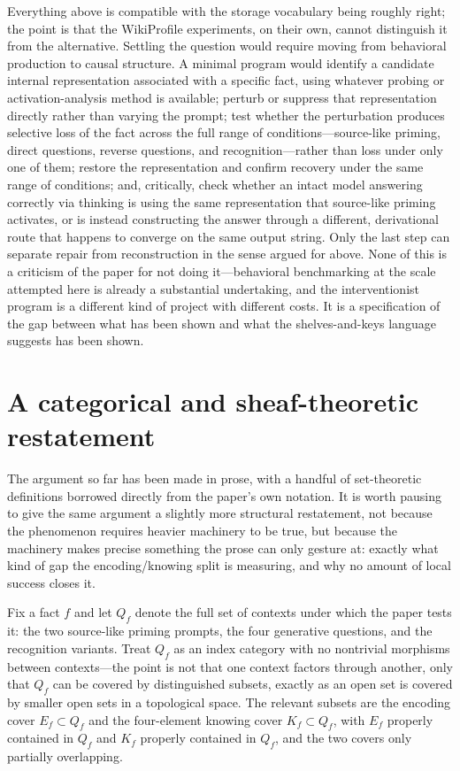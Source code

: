 \documentclass[11pt]{article}
\begin{document}
Everything above is compatible with the storage vocabulary being roughly right; the point is that the WikiProfile experiments, on their own, cannot distinguish it from the alternative. Settling the question would require moving from behavioral production to causal structure. A minimal program would identify a candidate internal representation associated with a specific fact, using whatever probing or activation-analysis method is available; perturb or suppress that representation directly rather than varying the prompt; test whether the perturbation produces selective loss of the fact across the full range of conditions---source-like priming, direct questions, reverse questions, and recognition---rather than loss under only one of them; restore the representation and confirm recovery under the same range of conditions; and, critically, check whether an intact model answering correctly via thinking is using the same representation that source-like priming activates, or is instead constructing the answer through a different, derivational route that happens to converge on the same output string. Only the last step can separate repair from reconstruction in the sense argued for above. None of this is a criticism of the paper for not doing it---behavioral benchmarking at the scale attempted here is already a substantial undertaking, and the interventionist program is a different kind of project with different costs. It is a specification of the gap between what has been shown and what the shelves-and-keys language suggests has been shown.

\section{A categorical and sheaf-theoretic restatement}

The argument so far has been made in prose, with a handful of set-theoretic definitions borrowed directly from the paper's own notation. It is worth pausing to give the same argument a slightly more structural restatement, not because the phenomenon requires heavier machinery to be true, but because the machinery makes precise something the prose can only gesture at: exactly what kind of gap the encoding/knowing split is measuring, and why no amount of local success closes it.

Fix a fact $f$ and let $Q_f$ denote the full set of contexts under which the paper tests it: the two source-like priming prompts, the four generative questions, and the recognition variants. Treat $Q_f$ as an index category with no nontrivial morphisms between contexts---the point is not that one context factors through another, only that $Q_f$ can be covered by distinguished subsets, exactly as an open set is covered by smaller open sets in a topological space. The relevant subsets are the encoding cover $E_f \subset Q_f$ and the four-element knowing cover $K_f \subset Q_f$, with $E_f$ properly contained in $Q_f$ and $K_f$ properly contained in $Q_f$, and the two covers only partially overlapping.
\end{document}
